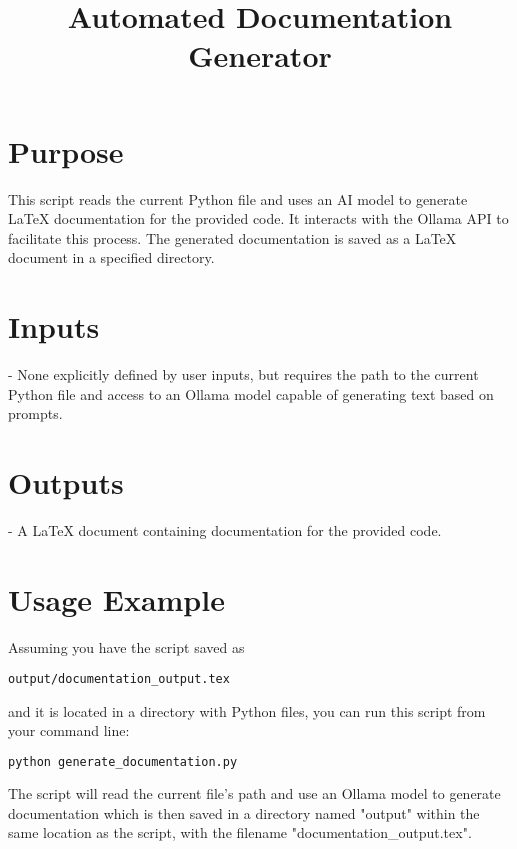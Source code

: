 \documentclass{article}
\begin{document}
\title{Automated Documentation Generator}
\author{}
\date{}
\maketitle

\section*{Purpose}
This script reads the current Python file and uses an AI model to generate LaTeX documentation for the provided code. It interacts with the Ollama API to facilitate this process. The generated documentation is saved as a LaTeX document in a specified directory.

\section*{Inputs}
- None explicitly defined by user inputs, but requires the path to the current Python file and access to an Ollama model capable of generating text based on prompts.

\section*{Outputs}
- A LaTeX document containing documentation for the provided code.

\section*{Usage Example}
Assuming you have the script saved as \begin{lstlisting}
output/documentation_output.tex
\end{lstlisting} 
and it is located in a directory with Python files, you can run this script from your command line:

\begin{lstlisting}[language=bash]
python generate_documentation.py
\end{lstlisting}

The script will read the current file's path and use an Ollama model to generate documentation which is then saved in a directory named "output" within the same location as the script, with the filename "documentation\_output.tex".
\end{document}

